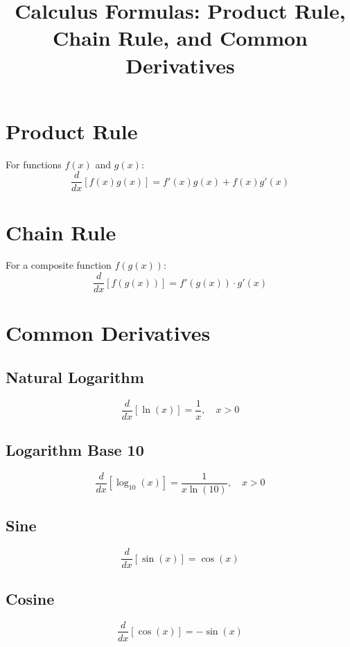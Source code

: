 \documentclass{article}
\begin{document}
\title{Calculus Formulas: Product Rule, Chain Rule, and Common Derivatives}
\author{}
\date{}

\maketitle

\section{Product Rule}
For functions $f(x)$ and $g(x)$:
\[
\frac{d}{dx}[f(x)g(x)] = f'(x)g(x) + f(x)g'(x)
\]

\section{Chain Rule}
For a composite function $f(g(x))$:
\[
\frac{d}{dx}[f(g(x))] = f'(g(x)) \cdot g'(x)
\]

\section{Common Derivatives}

\subsection{Natural Logarithm}
\[
\frac{d}{dx}[\ln(x)] = \frac{1}{x}, \quad x > 0
\]

\subsection{Logarithm Base 10}
\[
\frac{d}{dx}[\log_{10}(x)] = \frac{1}{x \ln(10)}, \quad x > 0
\]

\subsection{Sine}
\[
\frac{d}{dx}[\sin(x)] = \cos(x)
\]

\subsection{Cosine}
\[
\frac{d}{dx}[\cos(x)] = -\sin(x)
\]
\end{document}
